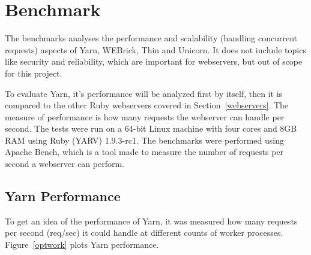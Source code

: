 \section{Benchmark}
\label{eval}
The benchmarks analyses the performance and scalability (handling
concurrent requests) aspects of Yarn, WEBrick, Thin and Unicorn. It does not
include topics like security and reliability, which are important for
webservers, but out of scope for this project.

To evaluate Yarn, it's performance will be analyzed first by itself, then it
is compared to the other Ruby webservers covered in Section~\ref{webservers}.
The measure of performance is how many requests the webserver can handle per
second. The tests were run on a 64-bit Linux machine with four cores and 8GB
RAM using Ruby (YARV) 1.9.3-rc1. The benchmarks were performed using Apache
Bench, which is a tool made to measure the number of requests per second a
webserver can perform.

\subsection{Yarn Performance}
To get an idea of the performance of Yarn, it was measured how many requests
per second (req/sec) it could handle at different counts of worker processes.
Figure~\ref{optwork} plots Yarn performance.

